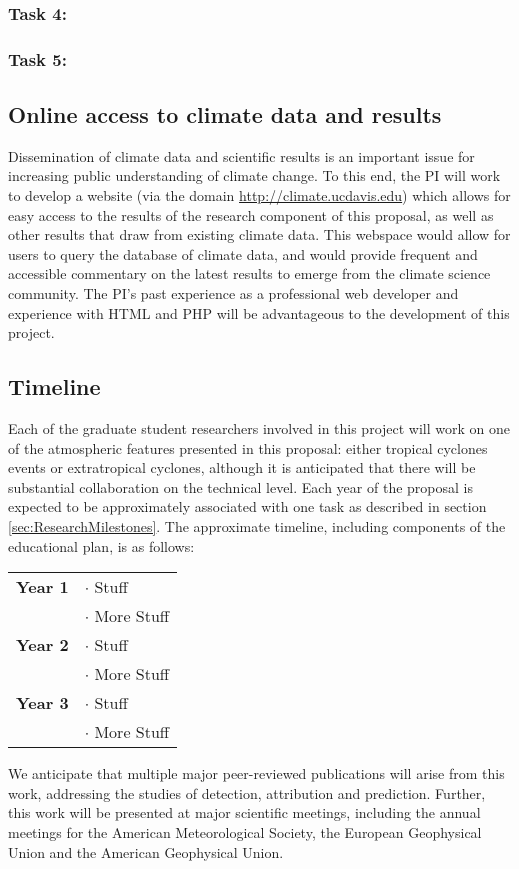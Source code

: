 \documentclass[11pt]{article}
\begin{document}
\subsubsection{Task 4:}

\subsubsection{Task 5:}

\subsection{Online access to climate data and results}

Dissemination of climate data and scientific results is an important issue for increasing public understanding of climate change.  To this end, the PI will work to develop a website (via the domain \url{http://climate.ucdavis.edu}) which allows for easy access to the results of the research component of this proposal, as well as other results that draw from existing climate data.  This webspace would allow for users to query the database of climate data, and would provide frequent and accessible commentary on the latest results to emerge from the climate science community.  The PI's past experience as a professional web developer and experience with HTML and PHP will be advantageous to the development of this project.

\subsection{Timeline} \label{sec:Timeline}

Each of the graduate student researchers involved in this project will work on one of the atmospheric features presented in this proposal: either tropical cyclones events or extratropical cyclones, although it is anticipated that there will be substantial collaboration on the technical level.  Each year of the proposal is expected to be approximately associated with one task as described in section \ref{sec:ResearchMilestones}.  The approximate timeline, including components of the educational plan, is as follows:

\begin{tabularx}{\textwidth}{cX}
\hline
\textbf{Year 1} & $\cdot$ Stuff \\
& $\cdot$ More Stuff \\
\hline
\textbf{Year 2} & $\cdot$ Stuff \\
& $\cdot$ More Stuff \\
\hline
\textbf{Year 3} & $\cdot$ Stuff \\
& $\cdot$ More Stuff \\
\hline
\end{tabularx}

We anticipate that multiple major peer-reviewed publications will arise from this work, addressing the studies of detection, attribution and prediction. Further, this work will be presented at major scientific meetings, including the annual meetings for the American Meteorological Society, the European Geophysical Union and the American Geophysical Union.

{\vbox{}}

\end{document}
